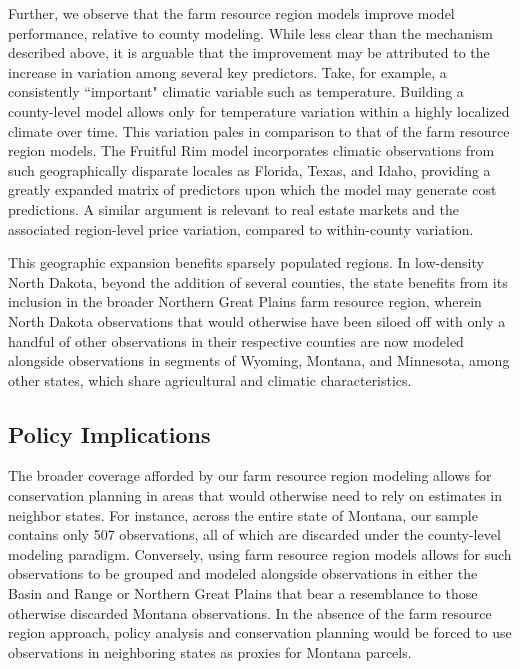 \documentclass[12pt]{article}
\begin{document}
Further, we observe that the farm resource region models improve model performance, relative to county modeling. While less clear than the mechanism described above, it is arguable that the improvement may be attributed to the increase in variation among several key predictors. Take, for example, a consistently ``important" climatic variable such as temperature. Building a county-level model allows only for temperature variation within a highly localized climate over time. This variation pales in comparison to that of the farm resource region models. The Fruitful Rim model incorporates climatic observations from such geographically disparate locales as Florida, Texas, and Idaho, providing a greatly expanded matrix of predictors upon which the model may generate cost predictions. A similar argument is relevant to real estate markets and the associated region-level price variation, compared to within-county variation.

This geographic expansion benefits sparsely populated regions.  In low-density North Dakota, beyond the addition of several counties, the state benefits from its inclusion in the broader Northern Great Plains farm resource region, wherein North Dakota observations that would otherwise have been siloed off with only a handful of other observations in their respective counties are now modeled alongside observations in segments of Wyoming, Montana, and Minnesota, among other states, which share agricultural and climatic characteristics. 

\subsection{Policy Implications}

The broader coverage afforded by our farm resource region modeling allows for conservation planning in areas that would otherwise need to rely on estimates in neighbor states. For instance, across the entire state of Montana, our sample contains only 507 observations, all of which are discarded under the county-level modeling paradigm. Conversely, using farm resource region models allows for such observations to be grouped and modeled alongside observations in either the Basin and Range or Northern Great Plains that bear a resemblance to those otherwise discarded Montana observations. In the absence of the farm resource region approach, policy analysis and conservation planning would be forced to use observations in neighboring states as proxies for Montana parcels.
\end{document}
